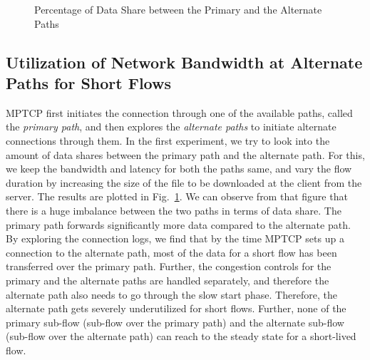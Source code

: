 \begin{figure}[!t]
\begin{center}
\begin{minipage}{0.45\linewidth}
		\label{fig:percentSentOverPathRTT320}
	\end{minipage}
	\caption{\label{fig:percentSentOverPath}Percentage of Data Share between the Primary and the Alternate Paths}
	\end{center}
\end{figure}


\subsection{Utilization of Network Bandwidth at Alternate Paths for Short Flows}
MPTCP first initiates the connection through one of the available paths, called the {\em primary path}, and then explores the {\em alternate paths} to initiate alternate connections through them. In the first experiment, we try to look into the amount of data shares between the primary path and the alternate path. For this, we keep the bandwidth and latency for both the paths same, and vary the flow duration by increasing the size of the file to be downloaded at the client from the server. The results are plotted in Fig.~\ref{fig:percentSentOverPath}. We can observe from that figure that there is a huge imbalance between the two paths in terms of data share. The primary path forwards significantly more data compared to the alternate path. By exploring the connection logs, we find that by the time MPTCP sets up a connection to the alternate path, most of the data for a short flow has been transferred over the primary path. Further, the congestion controls for the primary and the alternate paths are handled separately, and therefore the alternate path also needs to go through the slow start phase. Therefore, the alternate path gets severely underutilized for short flows. Further, none of the primary sub-flow (sub-flow over the primary path) and the alternate sub-flow (sub-flow over the alternate path) can reach to the steady state for a short-lived flow.   

%
%

